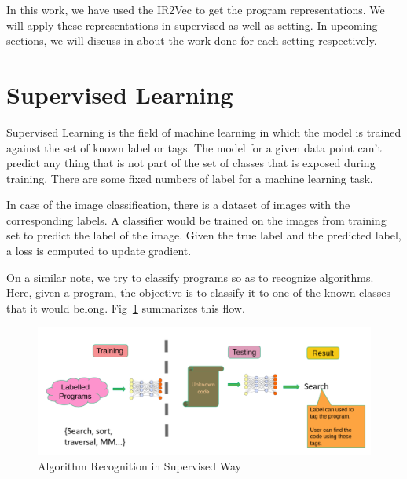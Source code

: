 In this work, we have used the IR2Vec to get the program representations. We will apply these representations in supervised as well as  setting. In  upcoming sections, we will discuss in about the work done for each setting respectively.

\section{Supervised Learning}\label{sec:algo:sup}
    Supervised Learning is the field of machine learning in which the model is trained against the set of known label or tags. The model for a given data point can't predict any thing that is not part of the set of classes that is exposed during training. There are some fixed numbers of label for a machine learning task.

In case of the image classification, there is a dataset of images with the corresponding labels. A classifier would be trained on the images from training set to predict the label of the image. Given the true label and the predicted label, a loss is computed to update gradient.

On a similar note, we try to classify programs so as to recognize algorithms. Here, given a program, the objective is to classify it to one of the known classes that it would belong. Fig~\ref{fig:supervised-background} summarizes this flow. 

\begin{figure}[t]
    \centering
    \includegraphics[scale=0.4]{figures/chapter-3/supervised_introduction.png}
    \caption{Algorithm Recognition in Supervised Way}
     \label{fig:supervised-background}
\end{figure}

